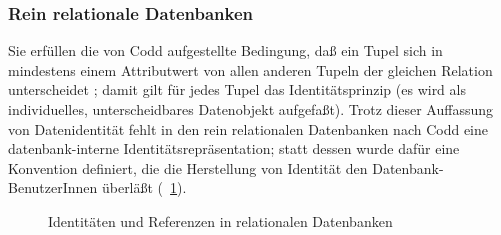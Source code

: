 \subsubsection{Rein relationale Datenbanken}
%
Sie erf\"{u}llen die von Codd \cite[]{bib:co79}
aufgestellte Bedingung, da\ss{} ein Tupel sich in mindestens einem
Attributwert von allen anderen Tupeln der gleichen Relation
unterscheidet \cite[]{bib:on94}; damit gilt f\"{u}r jedes
Tupel das Identit\"{a}tsprinzip (es wird als individuelles,
unterscheidbares Datenobjekt aufgefa\ss{}t). Trotz dieser Auffassung von
Datenidentit\"{a}t fehlt in den rein relationalen Datenbanken nach Codd
eine datenbank-interne Identit\"{a}tsrepr\"{a}sentation; statt dessen wurde
daf\"{u}r eine Konvention definiert, die die Herstellung von Identit\"{a}t
den Datenbank-BenutzerInnen \"{u}berl\"{a}\ss{}t
(\figurename~\ref{fig:reldbref}).
%
\begin{figure}[htbp]%
\ifbuch%
\centerline{}%
\else%
\centerline{}%
\fi%
\caption{Identit\"{a}ten und Referenzen in relationalen
Datenbanken}\label{fig:reldbref}%
\end{figure}%
%

